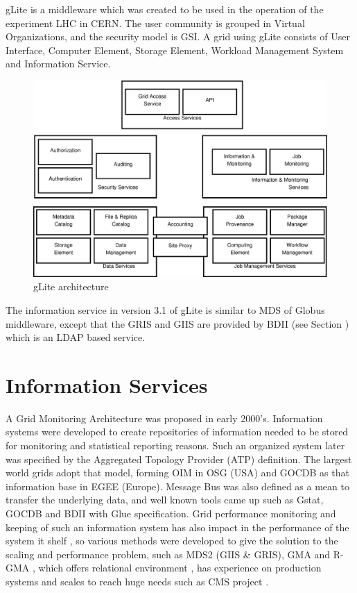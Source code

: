 gLite is a middleware which was created to be used in the operation of the experiment LHC in CERN. The user community is grouped in Virtual Organizations, and the security model is GSI. A grid using gLite consists of User Interface, Computer Element, Storage Element, Workload Management System and Information Service.

\begin{figure}[htb]
\centering
 \includegraphics[width=130mm]{images/glite.eps}
\caption{gLite architecture}
\label{figure:glite}
\end{figure}

The information service in version 3.1 of gLite is similar to MDS of Globus middleware, except that the GRIS and GIIS are provided by BDII (see Section ) which is an LDAP based service.


\section{Information Services}
A Grid Monitoring Architecture \cite{tierney2002grid} was proposed in early 2000's. Information systems were developed to create repositories of information needed to be stored for monitoring and statistical reporting reasons. Such an organized system later was specified by the Aggregated Topology Provider (ATP) definition. The largest world grids adopt that model, forming OIM in OSG (USA) and GOCDB as that information base in EGEE (Europe). Message Bus was also defined as a mean to transfer the underlying data, and well known tools came up such as Gstat, GOCDB and BDII with Glue specification. Grid performance monitoring and keeping of such an information system has also impact in the performance of the system it shelf \cite{zhang2003performance}, so various methods were developed to give the solution to the scaling and performance problem, such as MDS2 (GIIS \& GRIS), GMA and R-GMA \cite{wilson2004information}, which offers relational environment \cite{fisher2001relational}, has experience on production systems \cite{byrom-production} and scales to reach huge needs such as CMS project \cite{Bonacorsi2004,Byrom}.

